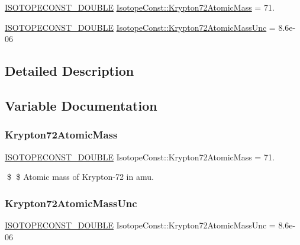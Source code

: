 \begin{DoxyCompactItemize}
\item 
\mbox{\hyperlink{group___isotope_const-_macros_ga8f45a7272ce02c0b4c65c44636ed719a}{I\+S\+O\+T\+O\+P\+E\+C\+O\+N\+S\+T\+\_\+\+D\+O\+U\+B\+LE}} \mbox{\hyperlink{group___isotope_const-_krypton-_kr72_ga12fabbc3350069ddfaa94c0d75b4740d}{Isotope\+Const\+::\+Krypton72\+Atomic\+Mass}} = 71.
\item 
\mbox{\hyperlink{group___isotope_const-_macros_ga8f45a7272ce02c0b4c65c44636ed719a}{I\+S\+O\+T\+O\+P\+E\+C\+O\+N\+S\+T\+\_\+\+D\+O\+U\+B\+LE}} \mbox{\hyperlink{group___isotope_const-_krypton-_kr72_ga2d41e7b72e8f91d94442643fe109723d}{Isotope\+Const\+::\+Krypton72\+Atomic\+Mass\+Unc}} = 8.\+6e-\/06
\end{DoxyCompactItemize}


\subsection{Detailed Description}


\subsection{Variable Documentation}
\mbox{\label{group___isotope_const-_krypton-_kr72_ga12fabbc3350069ddfaa94c0d75b4740d}} 
\subsubsection{\texorpdfstring{Krypton72\+Atomic\+Mass}{Krypton72AtomicMass}}
{\footnotesize\ttfamily \mbox{\hyperlink{group___isotope_const-_macros_ga8f45a7272ce02c0b4c65c44636ed719a}{I\+S\+O\+T\+O\+P\+E\+C\+O\+N\+S\+T\+\_\+\+D\+O\+U\+B\+LE}} Isotope\+Const\+::\+Krypton72\+Atomic\+Mass = 71.}

\$ \$ Atomic mass of Krypton-\/72 in amu. \mbox{\label{group___isotope_const-_krypton-_kr72_ga2d41e7b72e8f91d94442643fe109723d}} 
\subsubsection{\texorpdfstring{Krypton72\+Atomic\+Mass\+Unc}{Krypton72AtomicMassUnc}}
{\footnotesize\ttfamily \mbox{\hyperlink{group___isotope_const-_macros_ga8f45a7272ce02c0b4c65c44636ed719a}{I\+S\+O\+T\+O\+P\+E\+C\+O\+N\+S\+T\+\_\+\+D\+O\+U\+B\+LE}} Isotope\+Const\+::\+Krypton72\+Atomic\+Mass\+Unc = 8.\+6e-\/06}

